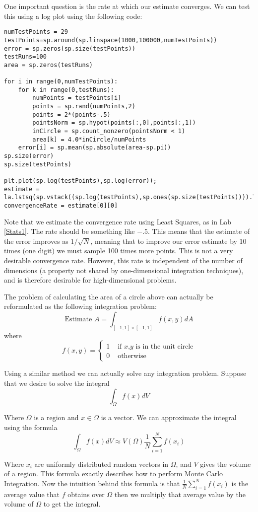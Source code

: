 One important question is the rate at which our estimate converges. We can test this using a log plot using the following code:
\begin{lstlisting}
numTestPoints = 29
testPoints=sp.around(sp.linspace(1000,100000,numTestPoints))
error = sp.zeros(sp.size(testPoints))
testRuns=100
area = sp.zeros(testRuns)

for i in range(0,numTestPoints):
	for k in range(0,testRuns):
		numPoints = testPoints[i]
		points = sp.rand(numPoints,2)
		points = 2*(points-.5)
		pointsNorm = sp.hypot(points[:,0],points[:,1])
		inCircle = sp.count_nonzero(pointsNorm < 1)
		area[k] = 4.0*inCircle/numPoints
	error[i] = sp.mean(sp.absolute(area-sp.pi))
sp.size(error)
sp.size(testPoints)

plt.plot(sp.log(testPoints),sp.log(error));
estimate = la.lstsq(sp.vstack((sp.log(testPoints),sp.ones(sp.size(testPoints)))).T,sp.log(error))
convergenceRate = estimate[0][0]
\end{lstlisting}

Note that we estimate the convergence rate using Least Squares, as in Lab \ref{Stats1}. The rate should be something like $-.5$. This means that the estimate of the error improves as $1/\sqrt{N}$, meaning that to improve our error estimate by 10 times (one digit) we must sample 100 times more points. This is not a very desirable convergence rate. However, this rate is independent of the number of dimensions (a property not shared by one-dimensional integration techniques), and is therefore desirable for high-dimensional problems.

The problem of calculating the area of a circle above can actually be reformulated as the following integration problem:
\[
\mbox{Estimate }A = \int_{[-1,1]\times[-1,1]} f(x,y) dA
\]
where
\[
f(x,y) = \begin{cases} 1 &\mbox{ if $x$,$y$ is in the unit circle} \\ 0 &\mbox{ otherwise} \end{cases}
\]

Using a similar method we can actually solve any integration problem. Suppose that we desire to solve the integral
\[
\int_\Omega f(x) dV
\]

Where $\Omega$ is a region and $x \in \Omega$ is a vector. We can approximate the integral using the formula
\[
\int_\Omega f(x) dV \approx V(\Omega) \frac{1}{N} \sum_{i=1}^N f(x_i)
\]

Where $x_i$ are uniformly distributed random vectors in $\Omega$, and $V$ gives the volume of a region. This formula exactly describes how to perform Monte Carlo Integration. Now the intuition behind this formula is that $\frac{1}{N} \sum_{i=1}^N f(x_i)$ is the average value that $f$ obtains over $\Omega$ then we multiply that average value by the volume of $\Omega$ to get the integral.

